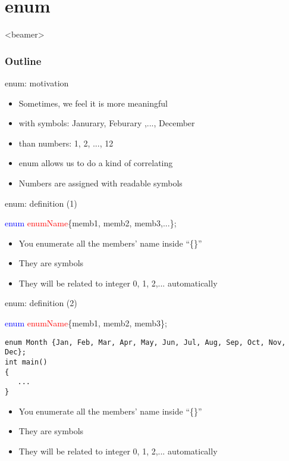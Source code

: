\section{enum}
\label{sec:enum}
\begin{frame}<beamer>
    \frametitle{Outline}
    \tableofcontents[currentsection]
\end{frame}

\begin{frame}{enum: motivation}
\begin{itemize}
	\item {Sometimes, we feel it is more meaningful }
	\item {with symbols: Janurary, Feburary ,..., December}
	\item {than numbers: 1, 2, ..., 12}
\end{itemize}

\begin{itemize}
	\item {enum allows us to do a kind of correlating}
	\item {Numbers are assigned with readable symbols}
\end{itemize}

\end{frame}

\begin{frame}{enum: definition (1)}
\begin{center}
	\Large{
	   \textcolor{blue}{enum} \textcolor{red}{enumName}\{memb1, memb2, memb3,...\};
	}
\end{center}

\begin{itemize}
	\item {You enumerate all the members' name inside ``\{\}''}
	\item {They are symbols}
	\item {They will be related to integer 0, 1, 2,... automatically}
\end{itemize}

\end{frame}

\begin{frame}[fragile]{enum: definition (2)}
\begin{center}
	\Large{
	   \textcolor{blue}{enum} \textcolor{red}{enumName}\{memb1, memb2, memb3\};
	}
\end{center}
\begin{lstlisting}
enum Month {Jan, Feb, Mar, Apr, May, Jun, Jul, Aug, Sep, Oct, Nov, Dec};
int main()
{
   ...
}
\end{lstlisting}
\begin{itemize}
	\item {You enumerate all the members' name inside ``\{\}''}
	\item {They are symbols}
	\item {They will be related to integer 0, 1, 2,... automatically}
\end{itemize}
\end{frame}


